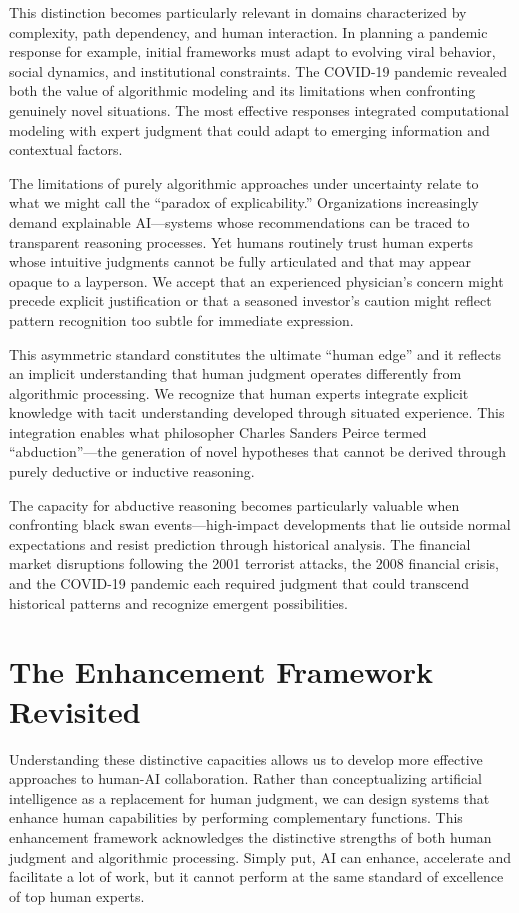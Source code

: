 \documentclass[
  Letterpaper,
]{scrbook}
\begin{document}
This distinction becomes particularly relevant in domains characterized
by complexity, path dependency, and human interaction. In planning a
pandemic response for example, initial frameworks must adapt to evolving
viral behavior, social dynamics, and institutional constraints. The
COVID-19 pandemic revealed both the value of algorithmic modeling and
its limitations when confronting genuinely novel situations. The most
effective responses integrated computational modeling with expert
judgment that could adapt to emerging information and contextual
factors.

The limitations of purely algorithmic approaches under uncertainty
relate to what we might call the ``paradox of explicability.''
Organizations increasingly demand explainable AI---systems whose
recommendations can be traced to transparent reasoning processes. Yet
humans routinely trust human experts whose intuitive judgments cannot be
fully articulated and that may appear opaque to a layperson. We accept
that an experienced physician's concern might precede explicit
justification or that a seasoned investor's caution might reflect
pattern recognition too subtle for immediate expression.

This asymmetric standard constitutes the ultimate ``human edge'' and it
reflects an implicit understanding that human judgment operates
differently from algorithmic processing. We recognize that human experts
integrate explicit knowledge with tacit understanding developed through
situated experience. This integration enables what philosopher Charles
Sanders Peirce termed ``abduction''---the generation of novel hypotheses
that cannot be derived through purely deductive or inductive reasoning.

The capacity for abductive reasoning becomes particularly valuable when
confronting black swan events---high-impact developments that lie
outside normal expectations and resist prediction through historical
analysis. The financial market disruptions following the 2001 terrorist
attacks, the 2008 financial crisis, and the COVID-19 pandemic each
required judgment that could transcend historical patterns and recognize
emergent possibilities.

\section{The Enhancement Framework
Revisited}\label{the-enhancement-framework-revisited}

Understanding these distinctive capacities allows us to develop more
effective approaches to human-AI collaboration. Rather than
conceptualizing artificial intelligence as a replacement for human
judgment, we can design systems that enhance human capabilities by
performing complementary functions. This enhancement framework
acknowledges the distinctive strengths of both human judgment and
algorithmic processing. Simply put, AI can enhance, accelerate and
facilitate a lot of work, but it cannot perform at the same standard of
excellence of top human experts.
\end{document}
